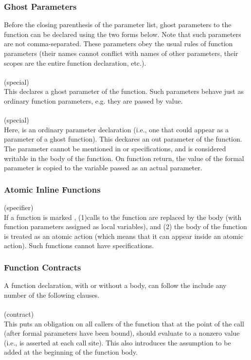 \documentclass[preprint,nocopyrightspace]{sigplanconf}
\begin{document}
{{{\begin{VCC}
\subsubsection{Ghost Parameters}

Before the closing parenthesis of the parameter list, ghost parameters
to the function can be declared using the two forms below. Note that
such parameters are not comma-separated.
These parameters obey the usual rules of function
parameters (their names cannot conflict with names of other
parameters, their scopes are the entire function declaration, etc.).
\\\\
 (special)\\
This declares a ghost parameter of the function. Such parameters
behave just as ordinary function parameters, e.g. they are passed by value.
\\\\
 (special)\\
Here,  is an ordinary parameter declaration (i.e., one that
could appear as a parameter of a ghost function). This 
deckares an out parameter of the function. The parameter
cannot be mentioned in  or 
specifications, and is considered writable in the body of the
function. On function return, the value of the formal parameter is
copied to the variable passed as an actual parameter.

\subsubsection{Atomic Inline Functions}

 (specifier)\\
If a function is marked , (1)calls to the
function are replaced by the body (with function parameters assigned
as local variables), and (2) the body of the function is treated as an
atomic action (which means that it can appear inside an atomic
action). Such functions cannot have specifications.

\subsubsection{Function Contracts}
A function declaration, with or without a body, can follow the
include any number of the following clauses. 
\\\\
 (contract)\\
This puts  an obligation on  all callers of  the function that  at the
point of the  call (after formal parameters have  been bound), 
should evaluate to a nonzero  value (i.e.,  is asserted at each
call site). This also introduces  the assumption to be added at
the beginning of the function body. 


\end{VCC}}}}
\end{document}
